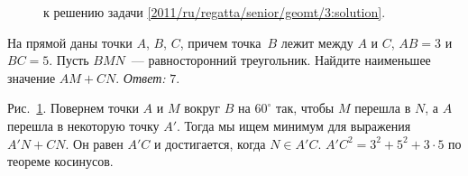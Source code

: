 \ifsolution
\begin{figure}\centering
    \caption{к решению задачи \ref{2011/ru/regatta/senior/geomt/3:solution}.}
    \label{2011/ru/regatta/senior/geomt/3:solution:fig}
\end{figure}%
\fi %

\problem
На прямой даны точки $A$, $B$, $C$, причем точка~$B$ лежит между $A$ и $C$,
$AB = 3$ и $BC = 5$.
Пусть $BMN$~--- равносторонний треугольник.
Найдите наименьшее значение $AM + CN$.
\solution
\label{2011/ru/regatta/senior/geomt/3:solution}%
\emph{Ответ:} $7$.
\par
Рис.~\ref{2011/ru/regatta/senior/geomt/3:solution:fig}.
Повернем точки $A$ и $M$ вокруг $B$ на $60^\circ$ так, чтобы $M$ перешла в $N$,
а $A$ перешла в некоторую точку $A'$.
Тогда мы ищем минимум для выражения $A'N + CN$.
Он равен $A'C$ и достигается, когда $N \in A'C$.
$A'C^2 = 3^2 + 5^2 + 3 \cdot 5$ по теореме косинусов.
\endproblem
